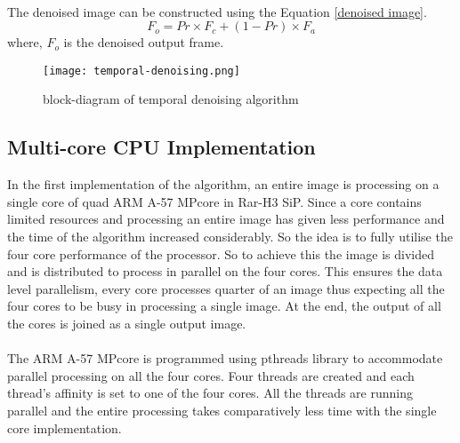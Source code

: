 \paragraph*{} The denoised image can be constructed using the Equation \ref{denoised image}.
\begin{equation}\label{denoised image}
F_o = Pr \times F_c + (1-Pr)\times  F_a
\end{equation}
where, $F_o$ is the denoised output frame.
\begin{figure}[h!]
	\centering
	\texttt{[image: temporal-denoising.png]}
	\caption{block-diagram of temporal denoising algorithm}
	\label{fig:temporal denoising}
\end{figure}
\subsection{Multi-core CPU Implementation}
In the first implementation of the algorithm, an entire image is processing on a single core of quad ARM A-57 MPcore in Rar-H3 SiP.  Since a core contains limited resources and processing an entire image has given less performance and the time of the algorithm increased considerably. So the idea is to fully utilise the four core performance of the processor. So to achieve this the image is divided and is distributed to process in parallel on the four cores. This ensures the data level parallelism, every core processes quarter of an image thus expecting all the four cores to be busy in processing a single image. At the end, the output of all the cores is joined as a single output image.\paragraph*{}The ARM A-57 MPcore is programmed using pthreads library to accommodate parallel processing on all the four cores. Four threads are created and each thread’s affinity is set to one of the four cores. All the threads are running parallel and the entire processing takes comparatively less time with the single core implementation.

